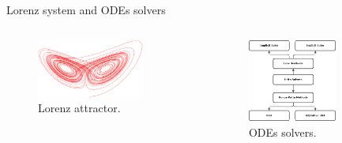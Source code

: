 \documentclass[aspectratio=169,xcolor=dvipsnames, t]{beamer}
\begin{document}
\begin{frame}{Lorenz system and ODEs solvers}
    \begin{columns}
\begin{column}{0.5\textwidth}
   \begin{figure}[ht!]
    \centering
    \includegraphics[width=0.8\textwidth]{figures/lorenz-attractor-112761.png}
    \caption{Lorenz attractor.}
    \label{fig:1}
\end{figure}
\end{column}
\begin{column}{0.5\textwidth}  %
    \begin{center}
     \begin{figure}[ht!]
    \centering
    \includegraphics[width=0.7\textwidth]{figures/ode.png}
    \caption{ODEs solvers.}
    \label{fig:1}
\end{figure}
     \end{center}
\end{column}
\end{columns}
\end{frame}
\end{document}
